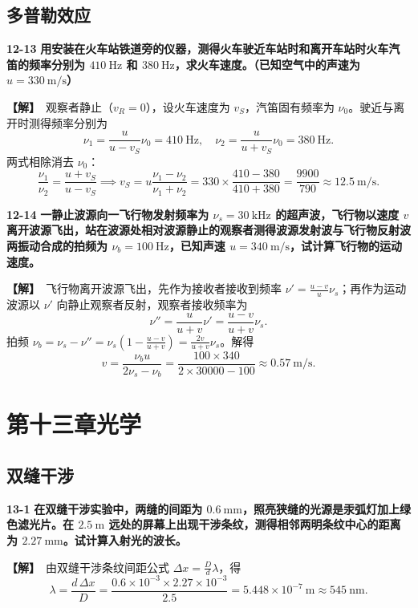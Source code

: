 \documentclass[zihao=5,a4paper,UTF8]{ctexart}
\newenvironment{prob}[2]{%
    \par\vspace{6pt}\noindent\textbf{\color{navy}#1} \textbf{#2}\par\nopagebreak\vspace{2pt}%
}{%
    \par\vspace{4pt}%
}
\newcommand{\sol}{\noindent\textbf{\color{tealaccent}【解】}\ }
\begin{document}
\subsection{多普勒效应}

\begin{prob}{12-13}{用安装在火车站铁道旁的仪器，测得火车驶近车站时和离开车站时火车汽笛的频率分别为 $410\ \mathrm{Hz}$ 和 $380\ \mathrm{Hz}$，求火车速度。（已知空气中的声速为 $u=330\ \mathrm{m/s}$）}
\sol 观察者静止（$v_R = 0$），设火车速度为 $v_S$，汽笛固有频率为 $\nu_0$。驶近与离开时测得频率分别为
\[
    \nu_1 = \frac{u}{u - v_S}\nu_0 = 410\ \mathrm{Hz},\quad \nu_2 = \frac{u}{u + v_S}\nu_0 = 380\ \mathrm{Hz}.
\]
两式相除消去 $\nu_0$：
\[
    \frac{\nu_1}{\nu_2} = \frac{u + v_S}{u - v_S} \implies v_S = u\frac{\nu_1 - \nu_2}{\nu_1 + \nu_2} = 330\times\frac{410 - 380}{410 + 380} = \frac{9900}{790} \approx 12.5\ \mathrm{m/s}.
\]
\end{prob}

\begin{prob}{12-14}{一静止波源向一飞行物发射频率为 $\nu_s=30\ \mathrm{kHz}$ 的超声波，飞行物以速度 $v$ 离开波源飞出，站在波源处相对波源静止的观察者测得波源发射波与飞行物反射波两振动合成的拍频为 $\nu_b=100\ \mathrm{Hz}$，已知声速 $u=340\ \mathrm{m/s}$，试计算飞行物的运动速度。}
\sol 飞行物离开波源飞出，先作为接收者接收到频率 $\nu' = \frac{u - v}{u}\nu_s$；再作为运动波源以 $\nu'$ 向静止观察者反射，观察者接收频率为
\[
    \nu'' = \frac{u}{u + v}\nu' = \frac{u - v}{u + v}\nu_s.
\]
拍频 $\nu_b = \nu_s - \nu'' = \nu_s\left(1 - \frac{u - v}{u + v}\right) = \frac{2v}{u + v}\nu_s$。解得
\[
    v = \frac{\nu_b u}{2\nu_s - \nu_b} = \frac{100\times 340}{2\times 30000 - 100} \approx 0.57\ \mathrm{m/s}.
\]
\end{prob}

\section{第十三章\quad 光学}

\subsection{双缝干涉}

\begin{prob}{13-1}{在双缝干涉实验中，两缝的间距为 $0.6\ \mathrm{mm}$，照亮狭缝的光源是汞弧灯加上绿色滤光片。在 $2.5\ \mathrm{m}$ 远处的屏幕上出现干涉条纹，测得相邻两明条纹中心的距离为 $2.27\ \mathrm{mm}$。试计算入射光的波长。}
\sol 由双缝干涉条纹间距公式 $\Delta x = \frac{D}{d}\lambda$，得
\[
    \lambda = \frac{d\,\Delta x}{D} = \frac{0.6\times 10^{-3}\times 2.27\times 10^{-3}}{2.5} = 5.448\times 10^{-7}\ \mathrm{m} \approx 545\ \mathrm{nm}.
\]
\end{prob}
\end{document}

